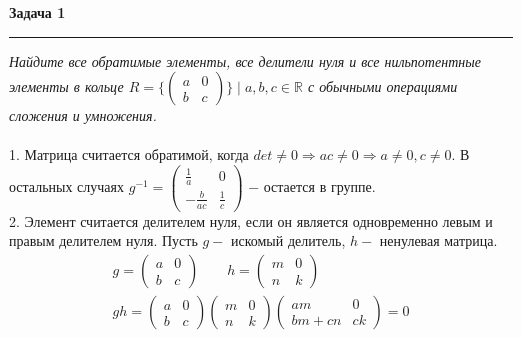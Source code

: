 \documentclass[a4paper,11pt]{article}
\begin{document}
\textbf{\large Задача 1}
\medskip\hrule\medskip
\textit{Найдите все обратимые элементы, все делители нуля и все нильпотентные элементы в кольце $ R = \{\begin{pmatrix}
		a & 0 \\[2pt]
		b & c
	\end{pmatrix}\} \; | \; a, b, c \in \mathbb{R} $ с обычными операциями сложения и умножения. } \\ \\ 
1. Матрица считается обратимой, когда $ det \neq 0 \Rightarrow ac \neq 0 \Rightarrow a \neq 0, c \neq 0$. В остальных случаях $ g^{-1} = 
\begin{pmatrix}
	\frac1{a} & 0 \\[2pt]
	-\frac{b}{ac} & \frac1{c} 
\end{pmatrix} $ $ - $ остается в группе.\\
2. Элемент считается делителем нуля, если он является одновременно левым и правым делителем нуля. Пусть $ g - $ искомый делитель, $ h - $ ненулевая матрица.
\begin{gather*}
	g = \begin{pmatrix}
		a & 0 \\[2pt]
		b & c
	\end{pmatrix}
	\qquad 
	h = \begin{pmatrix}
		m & 0 \\[2pt]
		n & k
	\end{pmatrix} \\[2pt]
	gh = \begin{pmatrix}
	a & 0 \\[2pt]
	b & c
	\end{pmatrix}
	\begin{pmatrix}
	m & 0 \\[2pt]
	n & k
	\end{pmatrix}
	\begin{pmatrix}
	am & 0 \\[2pt]
	bm + cn & ck
	\end{pmatrix}
	= 0
\end{gather*}
\end{document}
